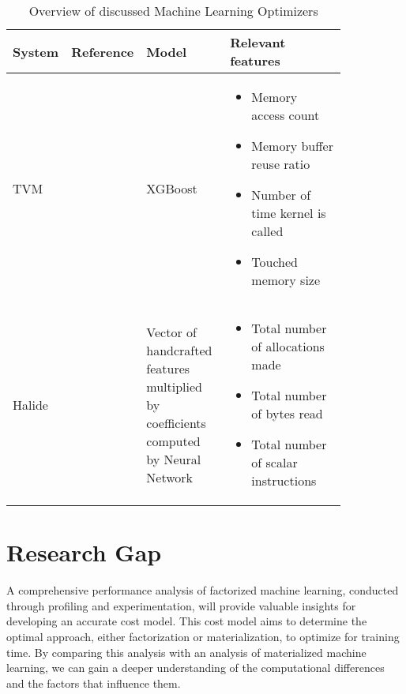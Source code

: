 \begin{table}[ht]
    \centering
    \begin{tabular}{p{0.15\linewidth}p{0.09\linewidth}p{0.25\linewidth}p{0.35\linewidth}}
        \toprule
        System & Reference                & Model                                                                                & Relevant features                                                                                                                                                                              \\ \midrule \midrule

        TVM    & \cite{tvm}               & XGBoost                                                                              & \begin{itemize}[noitemsep,topsep=0pt,leftmargin=0.3cm] \item Memory access count \item Memory buffer reuse ratio \item Number of time kernel is called \item Touched memory size \end{itemize} \\ \midrule
        Halide & \cite{halide_cost_model} & Vector of handcrafted features multiplied by coefficients computed by Neural Network & \begin{itemize}[noitemsep,topsep=0pt,leftmargin=0.3cm] \item Total number of allocations made \item Total number of bytes read \item Total number of scalar instructions \end{itemize}         \\ \bottomrule
    \end{tabular}
    \caption{Overview of discussed Machine Learning Optimizers}
    \label{tab:optimizer_overview}
\end{table}

\section{Research Gap}
A comprehensive performance analysis of factorized machine learning, conducted through profiling and experimentation, will provide valuable insights for developing an accurate cost model. This cost model aims to determine the optimal approach, either factorization or materialization, to optimize for training time. By comparing this analysis with an analysis of materialized machine learning, we can gain a deeper understanding of the computational differences and the factors that influence them.


